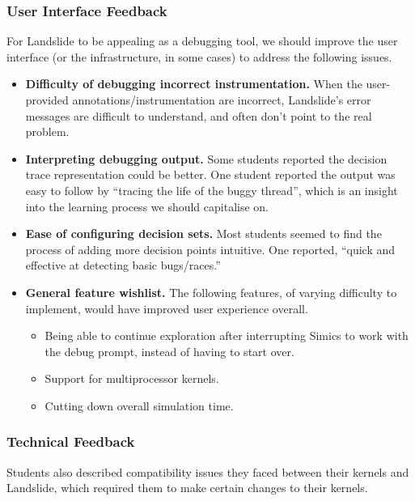 \subsubsection{User Interface Feedback}

For Landslide to be appealing as a debugging tool, we should improve the user interface (or the infrastructure, in some cases) to address the following issues.

\begin{itemize}
	\item {\bf Difficulty of debugging incorrect instrumentation.} When the user-provided annotations/instrumentation are incorrect, Landslide's error messages are difficult to understand, and often don't point to the real problem.
	\item {\bf Interpreting debugging output.} Some students reported the decision trace representation could be better. One student reported the output was easy to follow by ``tracing the life of the buggy thread'', which is an insight into the learning process we should capitalise on.
	\item {\bf Ease of configuring decision sets.} Most students seemed to find the process of adding more decision points intuitive. One reported, ``quick and effective at detecting basic bugs/races.''
	\item {\bf General feature wishlist.} The following features, of varying difficulty to implement, would have improved user experience overall.
		\begin{itemize}
			\item Being able to continue exploration after interrupting Simics to work with the debug prompt, instead of having to start over.
			\item Support for multiprocessor kernels.
			\item Cutting down overall simulation time.
		\end{itemize}
\end{itemize}

\subsubsection{Technical Feedback}

Students also described compatibility issues they faced between their kernels and Landslide, which required them to make certain changes to their kernels.

